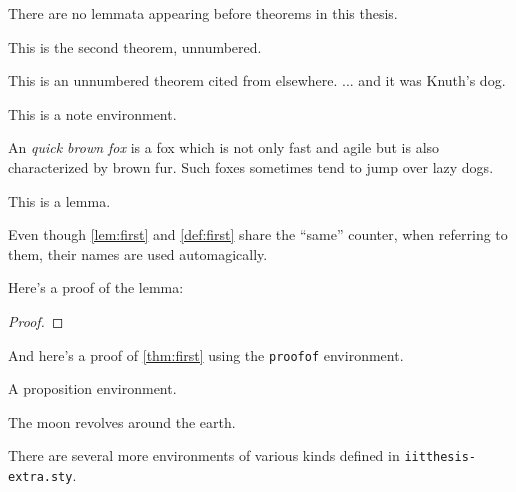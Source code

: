 \begin{corollary}
\label{cor:first}
There are no lemmata appearing before theorems in this thesis.
\end{corollary}

\begin{theorem*}
This is the second theorem, unnumbered.
\end{theorem*}

\begin{theorem*}
This is an unnumbered theorem cited from elsewhere.  ... and it was Knuth's dog.
\end{theorem*}

\begin{note}
This is a note environment.  
\end{note}

\begin{definition}
\label{def:first}
An \emph{quick brown fox} is a fox which is not only fast and agile but is also characterized by brown fur. Such foxes sometimes tend to jump over lazy dogs.
\end{definition}

\begin{lemma}
\label{lem:first}
This is a lemma. 
\end{lemma}

Even though \autoref{lem:first} and \autoref{def:first} share the ``same'' counter, when referring to them, their names are used automagically.

Here's a proof of the lemma:
\begin{proof}%
\lipsum[2]
\end{proof}

And here's a proof of \autoref{thm:first} using the \verb|proofof| environment.
\begin{proofof}
\lipsum[3]
\end{proofof}

\begin{proposition}
\label{prop:first}
A proposition environment. 
\end{proposition}

\begin{observation}
\label{obs:first}
The moon revolves around the earth.
\end{observation}

There are several more environments of various kinds defined in \texttt{iitthesis-extra.sty}.

